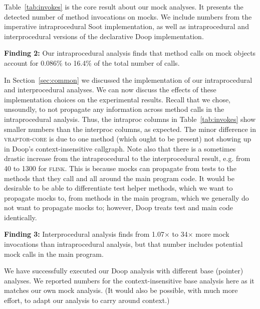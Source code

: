 Table~\ref{tab:invokes} is the core result about our mock analyses. It presents the detected number of method invocations on mocks. We include numbers from the imperative intraprocedural Soot implementation, as well as intraprocedural and interprocedural versions of the declarative Doop implementation.

\begin{mdframed}[
  leftmargin=\parindent,
  rightmargin=\parindent,
  skipabove=\topsep,
  skipbelow=\topsep
  ]
{\bf Finding 2:} Our intraprocedural analysis finds that method calls on mock objects account for 0.086\% to 16.4\% of the total number of calls. 
\end{mdframed}


In Section~\ref{sec:common} we discussed the implementation of our intraprocedural and interprocedural analyses. We can now discuss the effects of these implementation choices on the experimental results. Recall that we chose, unsoundly, to not propagate any information across method calls in the intraprocedural analysis. Thus, the intraproc columns in Table~\ref{tab:invokes} show smaller numbers than the interproc columns, as expected. The minor difference in \textsc{vraptor-core} is due to one method (which ought to be present) not showing up in Doop's context-insensitive callgraph. Note also that there is a sometimes drastic increase from the intraprocedural to the interprocedural result, e.g. from 40 to 1300 for \textsc{flink}. This is because mocks can propagate from tests to the methods that they call and all around the main program code. It would be desirable to be able to differentiate test helper methods, which we want to propagate mocks to, from methods in the main program, which we generally do not want to propagate mocks to; however, Doop treats test and main code identically.

\begin{mdframed}[
  leftmargin=\parindent,
  rightmargin=\parindent,
  skipabove=\topsep,
  skipbelow=\topsep
  ]
{\bf Finding 3:} Interprocedural analysis finds from 1.07$\times$ to 34$\times$ more mock invocations than intraprocedural analysis, but that number includes potential mock calls in the main program.
\end{mdframed}

We have successfully executed our Doop analysis with different base (pointer) analyses. We reported numbers for the context-insensitive base analysis here as it matches our own mock analysis. (It would also be possible, with much more effort, to adapt our analysis to carry around context.)

